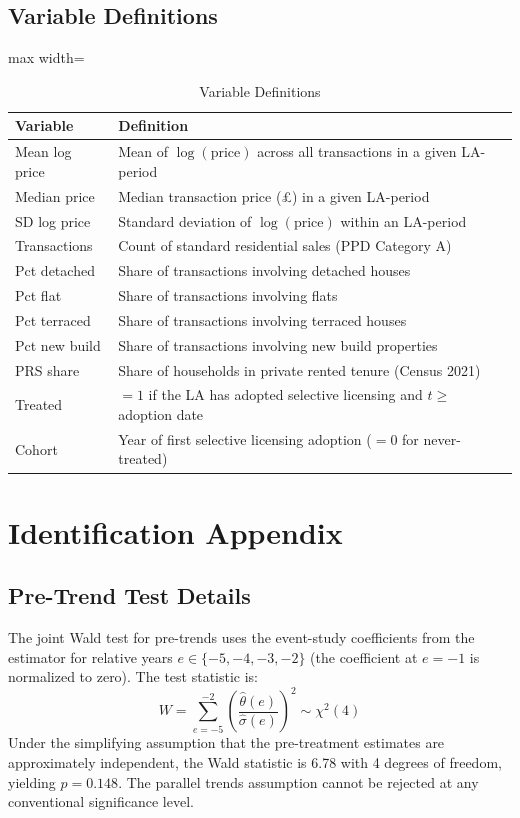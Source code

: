 \documentclass[12pt]{article}
\begin{document}
\subsection{Variable Definitions}

\begin{table}[H]
\centering
\caption{Variable Definitions}
\begin{adjustbox}{max width=\textwidth}
\begin{tabular}{lp{10cm}}
\toprule
Variable & Definition \\
\midrule
Mean log price & Mean of $\log(\text{price})$ across all transactions in a given LA-period \\
Median price & Median transaction price (\pounds) in a given LA-period \\
SD log price & Standard deviation of $\log(\text{price})$ within an LA-period \\
Transactions & Count of standard residential sales (PPD Category A) \\
Pct detached & Share of transactions involving detached houses \\
Pct flat & Share of transactions involving flats \\
Pct terraced & Share of transactions involving terraced houses \\
Pct new build & Share of transactions involving new build properties \\
PRS share & Share of households in private rented tenure (Census 2021) \\
Treated & $= 1$ if the LA has adopted selective licensing and $t \geq$ adoption date \\
Cohort & Year of first selective licensing adoption ($= 0$ for never-treated) \\
\bottomrule
\end{tabular}
\end{adjustbox}
\end{table}


\section{Identification Appendix}
\label{sec:app_id}

\subsection{Pre-Trend Test Details}

The joint Wald test for pre-trends uses the event-study coefficients from the \citet{callaway2021difference} estimator for relative years $e \in \{-5, -4, -3, -2\}$ (the coefficient at $e = -1$ is normalized to zero). The test statistic is:
\begin{equation}
W = \sum_{e=-5}^{-2} \left(\frac{\hat{\theta}(e)}{\hat{\sigma}(e)}\right)^2 \sim \chi^2(4)
\end{equation}
Under the simplifying assumption that the pre-treatment estimates are approximately independent, the Wald statistic is 6.78 with 4 degrees of freedom, yielding $p = 0.148$. The parallel trends assumption cannot be rejected at any conventional significance level.
\end{document}
